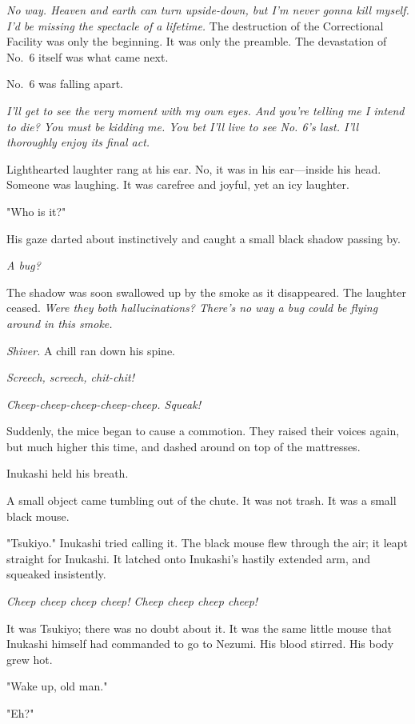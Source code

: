 \emph{No way. Heaven and earth can turn upside-down, but I'm never gonna kill
myself. I'd be missing the spectacle of a lifetime.} The destruction of
the Correctional Facility was only the beginning. It was only the
preamble. The devastation of No.~6 itself was what came next.

No.~6 was falling apart.

\emph{I'll get to see the very moment with my own eyes. And you're telling me
I intend to die? You must be kidding me. You bet I'll live to see No.
6's last. I'll thoroughly enjoy its final act.}


Lighthearted laughter rang at his ear. No, it was in his ear---inside his
head. Someone was laughing. It was carefree and joyful, yet an icy
laughter.

"Who is it?"

His gaze darted about instinctively and caught a small black shadow
passing by.

\emph{A bug?}

The shadow was soon swallowed up by the smoke as it disappeared. The
laughter ceased. \emph{Were they both hallucinations? There's no way a bug
could be flying around in this smoke.}

\emph{Shiver.} A chill ran down his spine.

\emph{Screech, screech, chit-chit!}

\emph{Cheep-cheep-cheep-cheep-cheep. Squeak!}

Suddenly, the mice began to cause a commotion. They raised their voices
again, but much higher this time, and dashed around on top of the
mattresses.

Inukashi held his breath.

A small object came tumbling out of the chute. It was not trash. It was
a small black mouse.

"Tsukiyo." Inukashi tried calling it. The black mouse flew through the
air; it leapt straight for Inukashi. It latched onto Inukashi's hastily
extended arm, and squeaked insistently.

\emph{Cheep cheep cheep cheep! Cheep cheep cheep cheep!}

It was Tsukiyo; there was no doubt about it. It was the same little
mouse that Inukashi himself had commanded to go to Nezumi. His blood
stirred. His body grew hot.

"Wake up, old man."

"Eh?"

